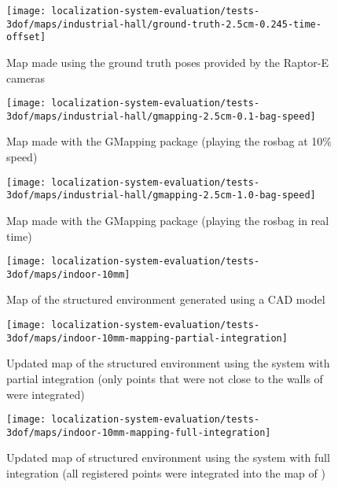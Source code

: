\begin{figure}[H]
	\centering
	\texttt{[image: localization-system-evaluation/tests-3dof/maps/industrial-hall/ground-truth-2.5cm-0.245-time-offset]}
	\caption{Map made using the ground truth poses provided by the Raptor-E cameras}
	\label{fig:localization-system-evaluation_ground-truth-2.5cm-0.245-time-offset}
\end{figure}


\begin{figure}[H]
	\centering
	\texttt{[image: localization-system-evaluation/tests-3dof/maps/industrial-hall/gmapping-2.5cm-0.1-bag-speed]}
	\caption{Map made with the GMapping package (playing the rosbag at 10\% speed)}
	\label{fig:localization-system-evaluation_gmapping-2.5cm-0.1-bag-speed}
\end{figure}

\begin{figure}[H]
	\centering
	\texttt{[image: localization-system-evaluation/tests-3dof/maps/industrial-hall/gmapping-2.5cm-1.0-bag-speed]}
	\caption{Map made with the GMapping package (playing the rosbag in real time)}
	\label{fig:localization-system-evaluation_gmapping-2.5cm-1.0-bag-speed}
\end{figure}


\begin{figure}[H]
	\centering
	\texttt{[image: localization-system-evaluation/tests-3dof/maps/indoor-10mm]}
	\caption{Map of the structured environment generated using a CAD model}
	\label{fig:localization-system-evaluation_indoor-10mm}
\end{figure}

\begin{figure}[H]
	\centering
	\texttt{[image: localization-system-evaluation/tests-3dof/maps/indoor-10mm-mapping-partial-integration]}
	\caption{Updated map of the structured environment using the  system with partial integration (only points that were not close to the walls of  were integrated)}
	\label{fig:localization-system-evaluation_indoor-10mm-mapping-partial-integration}
\end{figure}

\begin{figure}[H]
	\centering
	\texttt{[image: localization-system-evaluation/tests-3dof/maps/indoor-10mm-mapping-full-integration]}
	\caption{Updated map of structured environment using the  system with full integration (all registered points were integrated into the map of )}
	\label{fig:localization-system-evaluation_indoor-10mm-mapping-full-integration}
\end{figure}

